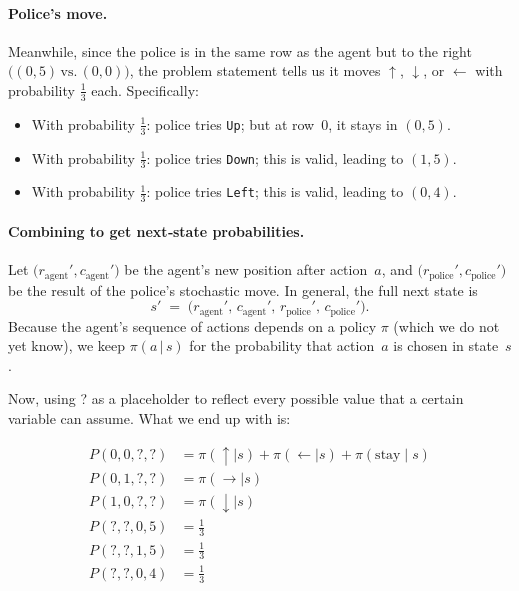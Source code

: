 \begin{enumerate}
    \paragraph{Police's move.}
    Meanwhile, since the police is in the same row as the agent but to the right 
    \(\bigl((0,5)\,\text{vs.}\,(0,0)\bigr)\), 
    the problem statement tells us it moves 
    \(\uparrow\), \(\downarrow\), or \(\leftarrow\) with probability \(\tfrac{1}{3}\) each. 
    Specifically:
    \begin{itemize}
      \item With probability \(\tfrac{1}{3}\): police tries \texttt{Up}; 
            but at row~0, it stays in \((0,5)\).
      \item With probability \(\tfrac{1}{3}\): police tries \texttt{Down}; 
            this is valid, leading to \((1,5)\).
      \item With probability \(\tfrac{1}{3}\): police tries \texttt{Left}; 
            this is valid, leading to \((0,4)\).
    \end{itemize}

    \paragraph{Combining to get next‐state probabilities.}
    Let \(\bigl(r_{\text{agent}}',c_{\text{agent}}'\bigr)\) be the agent’s new position 
    after action~\(a\), 
    and \(\bigl(r_{\text{police}}',c_{\text{police}}'\bigr)\) be the result of the police’s stochastic move.  
    In general, the full next state is 
    \[
      s' \;=\; \bigl(r_{\text{agent}}',\,c_{\text{agent}}',\,r_{\text{police}}',\,c_{\text{police}}'\bigr).
    \]
    Because the agent’s sequence of actions depends on a policy \(\pi\) (which we do not yet know), 
    we keep \(\pi(a\,\lvert\,s)\) for the probability that action~\(a\) is chosen in state~\(s\). 
    
    Now, using ? as a placeholder to reflect every possible value that a certain variable can assume.
    What we end up with is:

    \begin{align*}
      P(0, 0, ?, ?) &= \pi(\uparrow \mid s) + \pi(\leftarrow \mid s) + \pi(\text{stay} \mid s) \\
      P(0, 1, ?, ?) &= \pi(\rightarrow \mid s) \\
      P(1, 0, ?, ?) &= \pi(\downarrow \mid s) \\
      P(?, ?, 0, 5) &= \tfrac{1}{3} \\
      P(?, ?, 1, 5) &= \tfrac{1}{3} \\
      P(?, ?, 0, 4) &= \tfrac{1}{3}
    \end{align*}


\end{enumerate}
